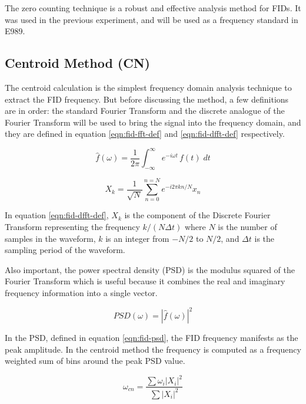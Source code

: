 The zero counting technique is a robust and effective analysis method for FIDs.  It was used in the previous \mugmtwo experiment, and will be used as a frequency standard in E989.

\subsection{Centroid Method (CN)}
The centroid calculation is the simplest frequency domain analysis technique to extract the FID frequency.  But before discussing the method, a few definitions are in order: the standard Fourier Transform and the discrete analogue of the Fourier Transform will be used to bring the signal into the frequency domain, and they are defined in equation \ref{eqn:fid-fft-def} and \ref{eqn:fid-dfft-def} respectively.

\begin{equation}
\label{eqn:fid-fft-def}
\hat{f}(\omega) = \frac{1}{2\pi} \int_{-\infty}^{\infty} e^{-i \omega t}\, f(t) \;dt
\end{equation}

\begin{equation}
\label{eqn:fid-dfft-def}
X_k = \frac{1}{\sqrt{N}} \sum_{n=0}^{n=N} e^{-i 2\pi k n / N} x_n
\end{equation}

\noindent
In equation \ref{eqn:fid-dfft-def}, $X_k$ is the component of the Discrete Fourier Transform representing the frequency $k / (N \Delta t)$ where $N$ is the number of samples in the waveform, $k$ is an integer from $-N/2$ to $N/2$, and $\Delta t$ is the sampling period of the waveform.  

Also important, the power spectral density (PSD) is the modulus squared of the Fourier Transform which is useful because it combines the real and imaginary frequency information into a single vector.

\begin{equation}
\label{eqn:fid-psd}
PSD(\omega) = |\hat{f}(\omega)|^2
\end{equation}

\noindent
In the PSD, defined in equation \ref{eqn:fid-psd}, the FID frequency manifests as the peak amplitude.  In the centroid method the frequency is computed as a frequency weighted sum of bins around the peak PSD value.

\begin{equation}
\label{eqn:freq-cn}
\omega_{cn} = 
\frac{\sum \omega_i |X_i|^2}{\sum |X_i|^2}
\end{equation}

